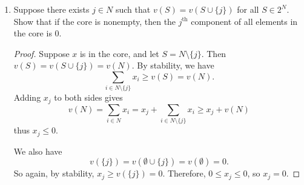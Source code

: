 \documentclass[10pt]{article}
\begin{document}
\begin{enumerate}
\item Suppose there exists $j \in N$ such that $v(S) = v(S \cup \{j\})$ for all $S \in 2^N$.  Show that if the core is nonempty, then the $j^\text{th}$ component of all elements in the core is 0.

\begin{proof}
Suppose $x$ is in the core, and let $S = N \setminus \{j\}$.  Then $v(S) = v(S \cup \{j\}) = v(N)$.  By stability, we have
$$
\sum_{i \in N \setminus \{j\}} x_i \geq v(S) = v(N).
$$
Adding $x_j$ to both sides gives
$$
v(N) = \sum_{i \in N} x_i = x_j + \sum_{i \in N \setminus \{j\}} x_i \geq x_j + v(N)
$$
thus $x_j \leq 0$.

We also have
$$
v(\{j\}) = v(\emptyset \cup \{j\}) = v(\emptyset) = 0.
$$
So again, by stability, $x_j \geq v(\{j\}) = 0$.  Therefore, $0 \leq x_j \leq 0$, so $x_j = 0$.
\end{proof}
\end{enumerate}
\end{document}
